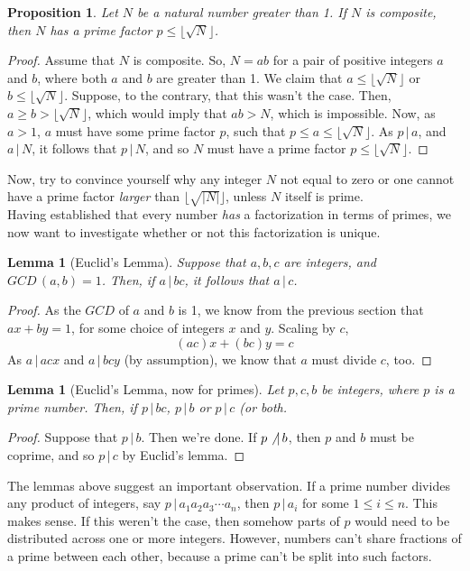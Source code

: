 \documentclass{article}
\newtheorem{lemma}[theorem]{Lemma}
\newtheorem{prop}{Proposition}
\newcommand{\floor}[1]{\lfloor #1 \rfloor}
\newcommand{\divv}{\,|\,}
\newcommand{\GCD}[2]{GCD\,(#1, #2)}
\begin{document}
\begin{mdframed} 
\begin{prop} 
Let $N$ be a natural number greater than 1. If $N$ is composite, then $N$ has a prime factor $p \leq \floor{\sqrt{N}}$. 
\end{prop}
\begin{proof} 
Assume that $N$ is composite. So, $N=ab$ for a pair of positive integers $a$ and $b$, where both $a$ and $b$ are greater than 1. We claim that $a\leq \floor{\sqrt{N}}$ or $b \leq \floor{\sqrt{N}}$. Suppose, to the contrary, that this wasn't the case. Then, $ a \geq b > \floor{\sqrt{N}}$, which would imply that $ab > N$, which is impossible. Now, as $a > 1$, $a$ must have some prime factor $p$, such that $p\leq a\leq \floor{\sqrt{N}}$. As $p\divv a$, and $a\divv N$, it follows that $p\divv N$, and so $N$ must have a prime factor $p \leq \floor{\sqrt{N}}$. 
\end{proof} 
\end{mdframed} 
Now, try to convince yourself why any integer $N$ not equal to zero or one cannot have a prime factor \textit{larger} than $\floor{\sqrt{|N|}}$, unless $N$ itself is prime. \\
Having established that every number \textit{has} a factorization in terms of primes, we now want to investigate whether or not this factorization is unique. 
\begin{mdframed} 
\begin{lemma}[Euclid's Lemma] Suppose that $a, b, c$ are integers, and $\GCD{a}{b} = 1$. Then, if $a\divv bc$, it follows that $a\divv c$. 
\end{lemma} 
\begin{proof} As the $GCD$ of $a$ and $b$ is 1, we know from the previous section that $ax+by = 1$, for some choice of integers $x$ and $y$. Scaling by $c$, 
\[(ac)x + (bc)y = c\]
As $a\divv acx$ and $a\divv bcy$ (by assumption), we know that $a$ must divide $c$, too.
\end{proof} 
\begin{lemma}[Euclid's Lemma, now for primes] Let $p, c, b$ be integers, where $p$ is a prime number. Then, if $p\divv bc$, $p\divv b$ or $p\divv c$ (or both. 
\end{lemma} 
\begin{proof} 
Suppose that $p\divv b$. Then we're done. If $p\not\divv b$, then $p$ and $b$ must be coprime, and so $p\divv c$ by Euclid's lemma. 
\end{proof} 
\end{mdframed} 
The lemmas above suggest an important observation. If a prime number divides any product of integers, say $p\divv a_1a_2a_3\cdots a_n$, then $p\divv a_i$ for some $1\leq i \leq n$. This makes sense. If this weren't the case, then somehow parts of $p$ would need to be distributed across one or more integers. However, numbers can't share fractions of a prime between each other, because a prime can't be split into such factors. \\ 
\end{document}
